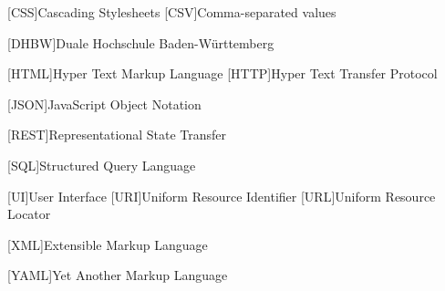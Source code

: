 
\begin{acronym}[YTMMM]
    \setlength{\itemsep}{0.8\baselineskip}

   
    [CSS]{Cascading Stylesheets}
    [CSV]{Comma-separated values}
    
    [DHBW]{Duale Hochschule Baden-Württemberg}

    [HTML]{Hyper Text Markup Language}
    [HTTP]{Hyper Text Transfer Protocol}

    [JSON]{JavaScript Object Notation}

    [REST]{Representational State Transfer}

    [SQL]{Structured Query Language}

    [UI]{User Interface}
    [URI]{Uniform Resource Identifier}
    [URL]{Uniform Resource Locator}

    [XML]{Extensible Markup Language}

    [YAML]{Yet Another Markup Language}
    

\end{acronym}